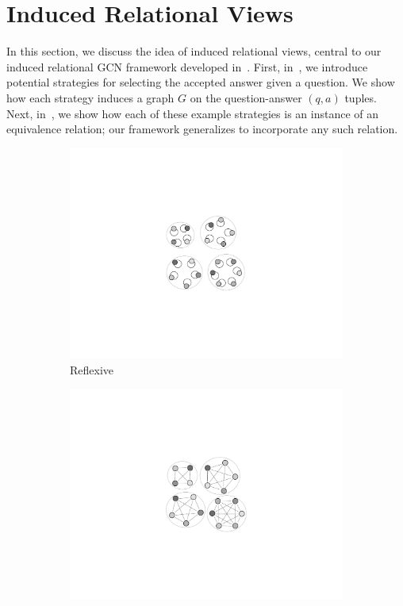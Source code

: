 \section{Induced Relational Views}
\label{sec:Induced Relational Views}
In this section, we discuss the idea of induced relational views, central to our induced relational GCN framework developed in~.
First, in~, we introduce potential strategies for selecting the accepted answer given a question. We show how each strategy induces a graph $G$ on the question-answer $(q,a)$ tuples. Next, in~, we show how each of these example strategies is an instance of an equivalence relation; our framework generalizes to incorporate any such relation.

\begin{figure}[h]
    \centering
    \begin{subfigure}{0.25\textwidth}
        \centering
        \includegraphics[scale=0.4]{figures/reflex_updated}
            \caption{Reflexive}
            \label{fig:reflexive}
    \end{subfigure}%
    \begin{subfigure}{0.27\textwidth}
        \centering
        \includegraphics[scale=0.4]{figures/Contrast_circle}

\end{subfigure}
\end{figure}
